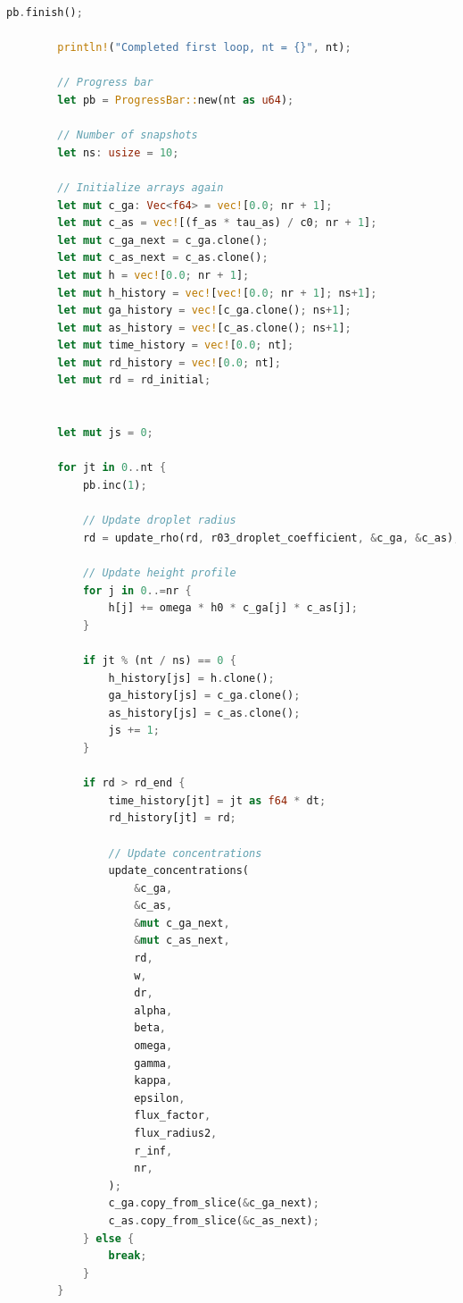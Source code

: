 \documentclass[14pt,oneside]{extarticle}
\begin{document}
\begin{lstlisting}[language=Rust]
        pb.finish();
    
        println!("Completed first loop, nt = {}", nt);
    
        // Progress bar
        let pb = ProgressBar::new(nt as u64);
    
        // Number of snapshots
        let ns: usize = 10;
    
        // Initialize arrays again
        let mut c_ga: Vec<f64> = vec![0.0; nr + 1];
        let mut c_as = vec![(f_as * tau_as) / c0; nr + 1];
        let mut c_ga_next = c_ga.clone();
        let mut c_as_next = c_as.clone();
        let mut h = vec![0.0; nr + 1];
        let mut h_history = vec![vec![0.0; nr + 1]; ns+1];
        let mut ga_history = vec![c_ga.clone(); ns+1];
        let mut as_history = vec![c_as.clone(); ns+1];
        let mut time_history = vec![0.0; nt];
        let mut rd_history = vec![0.0; nt];
        let mut rd = rd_initial;
    
    
        let mut js = 0;
    
        for jt in 0..nt {
            pb.inc(1);
    
            // Update droplet radius
            rd = update_rho(rd, r03_droplet_coefficient, &c_ga, &c_as);
    
            // Update height profile
            for j in 0..=nr {
                h[j] += omega * h0 * c_ga[j] * c_as[j];
            }
    
            if jt % (nt / ns) == 0 {
                h_history[js] = h.clone();
                ga_history[js] = c_ga.clone();
                as_history[js] = c_as.clone();
                js += 1;
            }
    
            if rd > rd_end {
                time_history[jt] = jt as f64 * dt;
                rd_history[jt] = rd;
    
                // Update concentrations
                update_concentrations(
                    &c_ga,
                    &c_as,
                    &mut c_ga_next,
                    &mut c_as_next,
                    rd,
                    w,
                    dr,
                    alpha,
                    beta,
                    omega,
                    gamma,
                    kappa,
                    epsilon,
                    flux_factor,
                    flux_radius2,
                    r_inf,
                    nr,
                );
                c_ga.copy_from_slice(&c_ga_next);
                c_as.copy_from_slice(&c_as_next);
            } else {
                break;
            }
        }
    

\end{lstlisting}
\end{document}
